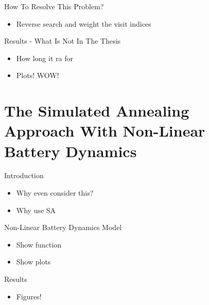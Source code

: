 \documentclass[bigger]{beamer}
\begin{document}
\begin{frame}[label={sec:org8518f48}]{How To Resolve This Problem?}
\begin{itemize}
\item Reverse search and weight the visit indices
\end{itemize}
\end{frame}
\begin{frame}[label={sec:org52c3f8c}]{Results - What Is Not In The Thesis}
\begin{itemize}
\item How long it ra for
\item Plots! WOW!
\end{itemize}
\end{frame}
\section{The Simulated Annealing Approach With Non-Linear Battery Dynamics}
\label{sec:org54657f3}
\begin{frame}[label={sec:org214a814}]{Introduction}
\begin{itemize}
\item Why even consider this?
\item Why use SA
\end{itemize}
\end{frame}
\begin{frame}[label={sec:org8b13bc8}]{Non-Linear Battery Dynamics Model}
\begin{itemize}
\item Show function
\item Show plots
\end{itemize}
\end{frame}
\begin{frame}[label={sec:orgf9b0797}]{Results}
\begin{itemize}
\item Figures!
\end{itemize}
\end{frame}
\end{document}
